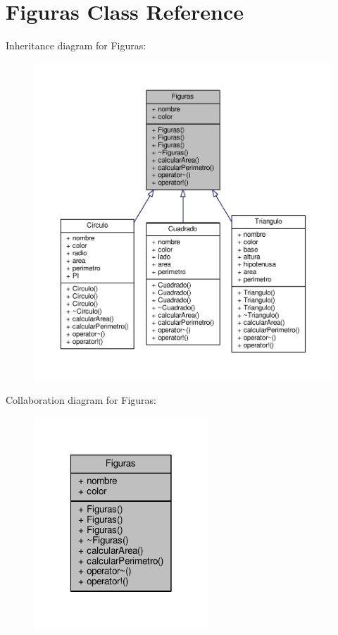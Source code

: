 \hypertarget{class_figuras}{}\section{Figuras Class Reference}
\label{class_figuras}


Inheritance diagram for Figuras\+:
\nopagebreak
\begin{figure}[H]
\begin{center}
\leavevmode
\includegraphics[width=350pt]{class_figuras__inherit__graph}
\end{center}
\end{figure}


Collaboration diagram for Figuras\+:
\nopagebreak
\begin{figure}[H]
\begin{center}
\leavevmode
\includegraphics[width=186pt]{class_figuras__coll__graph}
\end{center}
\end{figure}
